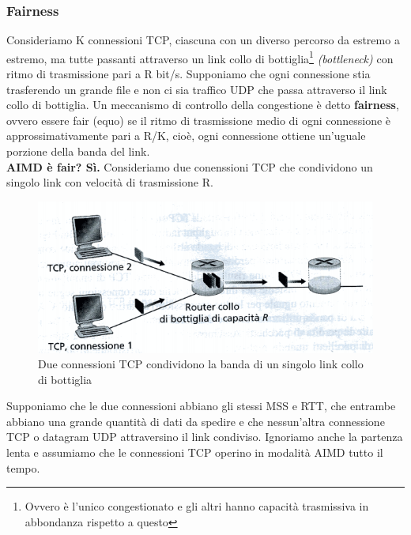 \documentclass[11pt,a4paper]{article}
\begin{document}
\subsubsection{Fairness}
Consideriamo K connessioni TCP, ciascuna con un diverso percorso da estremo a estremo, ma tutte passanti attraverso un link collo di bottiglia\footnote{Ovvero è l'unico congestionato e gli altri hanno capacità trasmissiva in abbondanza rispetto a questo} \textit{(bottleneck)} con ritmo di trasmissione pari a R bit/s. Supponiamo che ogni connessione stia trasferendo un grande file e non ci sia traffico UDP che passa attraverso il link collo di bottiglia. Un meccanismo di controllo della congestione è detto \textbf{fairness}, ovvero essere fair (equo) se il ritmo di trasmissione medio di ogni connessione è approssimativamente pari a R/K, cioè, ogni connessione ottiene un'uguale porzione della banda del link. \\
\textbf{AIMD è fair? Sì.} Consideriamo due conenssioni TCP che condividono un singolo link con velocità di trasmissione R.
\begin{figure}
	\includegraphics[scale=0.6]{img/047.png}
	\caption{Due connessioni TCP condividono la banda di un singolo link collo di bottiglia}
\end{figure}
Supponiamo che le due connessioni abbiano gli stessi MSS e RTT, che entrambe abbiano una grande quantità di dati da spedire e che nessun'altra connessione TCP o datagram UDP attraversino il link condiviso. Ignoriamo anche la partenza lenta e assumiamo che le connessioni TCP operino in modalità AIMD tutto il tempo.
\end{document}
